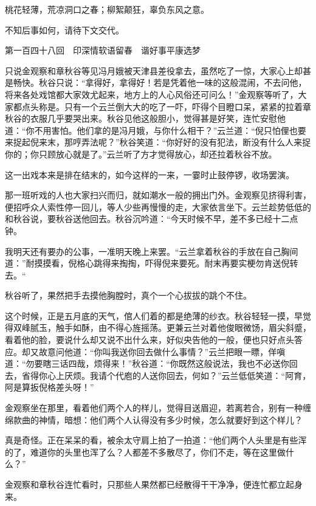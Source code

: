 \documentclass[12pt,UTF8]{ctexbook}
\begin{document}
{{{桃花轻薄，荒凉洞口之春；柳絮颠狂，辜负东风之意。

不知后事如何，请待下文交代。





第一百四十八回　印深情软语留春　谐好事平康选梦





只说金观察和章秋谷等见冯月娥被天津县差役拿去，虽然吃了一惊，大家心上却甚是畅快。秋谷只说：“拿得好，拿得好！若是凭着他一味的这般混闹，不去问他，将来各处戏馆都大家效尤起来，地方上的人心风俗还可问么！”金观察等听了，大家都点头称是。只有一个云兰倒大大的吃了一吓，吓得个目瞪口呆，紧紧的拉着章秋谷的衣服几乎要哭出来。秋谷见他这般胆小，觉得甚是好笑，连忙安慰他道：“你不用害怕。他们拿的是冯月娥，与你什么相干？”云兰道：“倪只怕俚也要来捉起倪来末，那哼弄法呢？”秋谷笑道：“你好好的没有犯法，断没有什么人来捉你的；你只顾放心就是了。”云兰听了方才觉得放心，却还拉着秋谷不放。

这一出戏本来是排在结末的，如今这样的一来，一霎时止鼓停锣，收场罢演。

那一班听戏的人也大家扫兴而归，就如潮水一般的拥出门外。金观察见挤得利害，便招呼众人索性停一回儿，等人少些再慢慢的走，大家依言坐下。云兰趁势低低的和秋谷说，要秋谷送他回去。秋谷沉吟道：“今天时候不早，差不多已经十二点钟。

我明天还有要办的公事，一准明天晚上来罢。“云兰拿着秋谷的手放在自己胸间道：”耐摸摸看，倪格心跳得来掏掏，吓得倪来要死。耐末再要实梗勿肯送倪转去。“

秋谷听了，果然把手去摸他胸膛时，真个一个心拔拔的跳个不住。

这个时候，正是五月底的天气，倌人们着的都是绝薄的纱衣。秋谷轻轻一摸，早觉得双峰腻玉，触手如酥，由不得心旌摇荡。更兼云兰对着他俊眼微饧，眉尖斜蹙，看着他的脸，要说什么却又说不出什么来，好似央告他的一般，便也只好点头答应。却又故意问他道：“你叫我送你回去做什么事情？”云兰把眼一瞟，佯嗔道：“勿要瞎三话四哉，烦得来！”秋谷道：“你既然这般说法，我也不必送你回去，省得你心上厌烦。我请个代庖的人送你回去，何如？”云兰低低笑道：“阿育，阿是算扳倪格差头呀！”

金观察坐在那里，看着他们两个人的样儿，觉得目送眉迎，若离若合，别有一种缠绵款曲的神情，暗想：他们两个人认得没有多少时候，怎么就要好到这个样儿？

真是奇怪。正在呆呆的看，被余太守肩上拍了一拍道：“他们两个人头里是有些浑的了，难道你的头里也浑了么？人都差不多散尽了，你们不走，等在这里做什么？”

金观察和章秋谷连忙看时，只那些人果然都已经散得干干净净，便连忙都立起身来。

}}}
\end{document}
